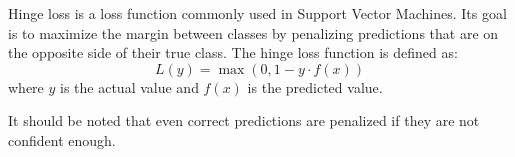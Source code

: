 Hinge loss is a loss function commonly used in Support Vector Machines. Its goal is to 
maximize the margin between classes by penalizing predictions that are on the opposite 
side of their true class. The hinge loss function is defined as:
\begin{equation}
    L(y) = \max(0, 1 - y \cdot f(x)) 
\end{equation}
where $y$ is the actual value and $f(x)$ is the predicted value.

It should be noted that even correct predictions are penalized if they are not confident 
enough.